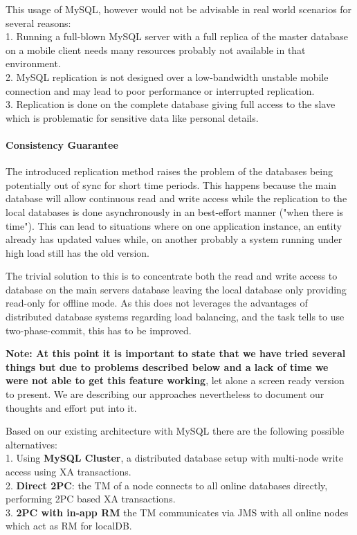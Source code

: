 \documentclass[twoside,colorbacktitle,accentcolor=tud1b]{tudexercise}
\begin{document}
This usage of MySQL, however would not be advisable in real world scenarios for several reasons: \\
1. Running a full-blown MySQL server with a full replica of the master database on a mobile client needs many resources probably not available in that environment. \\
2. MySQL replication is not designed over a low-bandwidth unstable mobile connection and may lead to poor performance or interrupted replication. \\
3. Replication is done on the complete database giving full access to the slave which is problematic for sensitive data like personal details. 

\paragraph{Consistency Guarantee}
The introduced replication method raises the problem of the databases being potentially out of sync for short time periods.
This happens because the main database will allow continuous read and write access while the replication to the local databases is done asynchronously in an best-effort manner ("when there is time").
This can lead to situations where on one application instance, an entity already has updated values while, on another probably a system running under high load still has the old version.

The trivial solution to this is to concentrate both the read and write access to database on the main servers database leaving the local database only providing read-only for offline mode.
As this does not leverages the advantages of distributed database systems regarding load balancing, and the task tells to use two-phase-commit, this has to be improved.

\textbf{Note: At this point it is important to state that we have tried several things but due to problems described below and a lack of time we were not able to get this feature working}, let alone a screen ready version to present. We are describing our approaches nevertheless to document our thoughts and effort put into it.

Based on our existing architecture with MySQL there are the following possible alternatives: \\
1. Using \textbf{MySQL Cluster}, a distributed database setup with multi-node write access using \ac{XA} transactions. \\
2. \textbf{Direct 2PC}: the \ac{TM} of a node connects to all online databases directly, performing 2PC based \ac{XA} transactions. \\
3. \textbf{2PC with in-app \ac{RM}} the \ac{TM} communicates via \ac{JMS} with all online nodes which act as \ac{RM} for \ac{localDB}.
\end{document}
